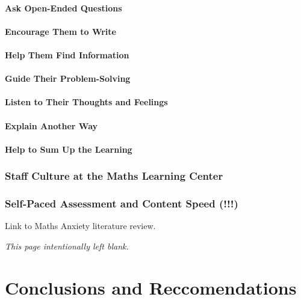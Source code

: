 \documentclass[twoside,12pt,a4paper]{report}
\makeatletter
\newcommand*{\intentionallyblankpage}{
  \vspace*{\fill}
  {\centering \textit{This page intentionally left blank.} \par}
  \vspace{\fill}}
\renewcommand*{\cleardoublepage}{\clearpage\if@twoside \ifodd\c@page\else
  \intentionallyblankpage
  \newpage
  \if@twocolumn\hbox{}\newpage\fi\fi\fi}
\makeatother
\begin{document}
\subsubsection{Ask Open-Ended Questions}

\subsubsection{Encourage Them to Write}

\subsubsection{Help Them Find Information}

\subsubsection{Guide Their Problem-Solving}

\subsubsection{Listen to Their Thoughts and Feelings}

\subsubsection{Explain Another Way}

\subsubsection{Help to Sum Up the Learning}




\subsection{Staff Culture at the Maths Learning Center}

\subsection{Self-Paced Assessment and Content Speed (!!!)}

Link to Maths Anxiety literature review.



\cleardoublepage
\chapter*{Conclusions and Reccomendations}
\end{document}
